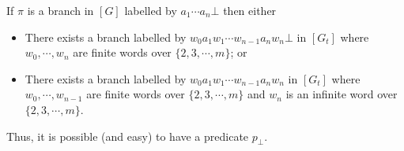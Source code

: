 \begin{remark} If $\pi$ is a branch in $[G]$ labelled by $a_1 \cdots a_n \bot$ then either
\begin{itemize}
\item There exists a branch labelled by $w_0 a_1 w_1 \cdots
w_{n-1} a_n w_n \bot$ in $[G_t]$ where $w_0, \cdots, w_n$ are
finite words over $\{2, 3, \cdots, m\}$; or \item There exists a
branch labelled by $w_0 a_1 w_1 \cdots w_{n-1} a_n w_n$ in $[G_t]$
where $w_0, \cdots, w_{n-1}$ are finite words over $\{2, 3,
\cdots, m\}$ and $w_n$ is an infinite word over $\{2, 3, \cdots,
m\}$.
\end{itemize}
Thus, it is possible (and easy) to have a predicate $p_\bot$.
\end{remark}

